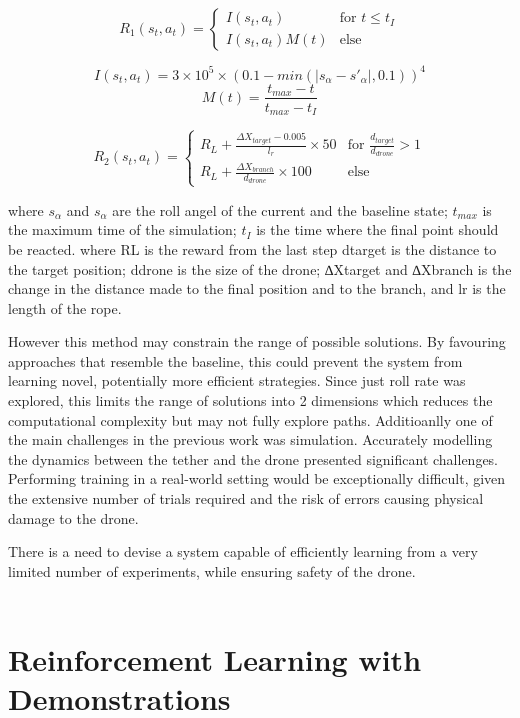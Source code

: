 \[
R_{1}(s_{t}, a_{t}) = 
\begin{cases} 
I(s_{t}, a_{t}) & \text{for } t \leq t_{I} \\
I(s_{t}, a_{t}) M(t) & \text{else} 
\end{cases}
\]

\[I(s_{t}, a_{t}) = 3 \times 10 ^ 5 \times (0.1 - min(|s_{\alpha} - s'_{\alpha}|, 0.1)) ^ 4\]
\[M(t) = \frac{t_{max} - t}{t_{max} - t_{I}}\]

\[
R_{2}(s_{t}, a_{t}) =
\begin{cases}
  R_{L} + \frac{\Delta X_{target} - 0.005}{l_{r}} \times 50 & \text{for } \frac{d_{target}}{d_{drone}} > 1 \\
  R_{L} + \frac{\Delta X_{branch}}{d_{drone}} \times 100 & \text{else}
\end{cases}
\]

where $s_{\alpha}$ and $s_{\alpha}$ are the roll angel of the current and the baseline state; 
$t_{max}$ is the maximum time of the simulation; 
$t_{I}$ is the time where the final point should be reacted.
where RL is the reward from the last step dtarget is the distance to the target position; 
ddrone is the size of the drone; 
∆Xtarget and ∆Xbranch is the change in the distance made to the final position and to the branch, and lr is the length of the rope.

However this method may constrain the range of possible solutions.
By favouring approaches that resemble the baseline, this could prevent the system from learning novel, potentially more efficient strategies.
Since just roll rate was explored, this limits the range of solutions into 2 dimensions which reduces the computational complexity but may not fully explore paths.
Additioanlly one of the main challenges in the previous work was simulation.
Accurately modelling the dynamics between the tether and the drone presented significant challenges.
Performing training in a real-world setting would be exceptionally difficult, given the extensive number of trials required and the risk of errors causing physical damage to the drone.

There is a need to devise a system capable of efficiently learning from a very limited number of experiments, while ensuring safety of the drone. \\\\

\section{Reinforcement Learning with Demonstrations}

